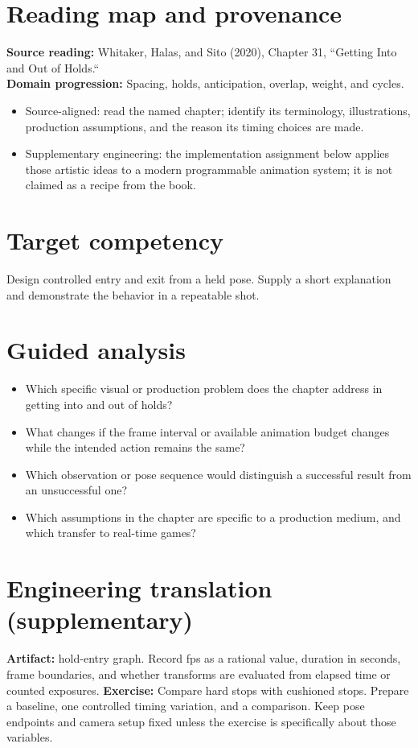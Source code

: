 \documentclass[10pt,letterpaper]{article}
\begin{document}
\makedoctitle
\makedocsummary

\section{Reading map and provenance}
\textbf{Source reading:} Whitaker, Halas, and Sito (2020), Chapter 31, ``Getting Into and Out of Holds.``\\
\textbf{Domain progression:} Spacing, holds, anticipation, overlap, weight, and cycles.
\begin{itemize}
\item Source-aligned: read the named chapter; identify its terminology, illustrations, production assumptions, and the reason its timing choices are made.
\item Supplementary engineering: the implementation assignment below applies those artistic ideas to a modern programmable animation system; it is not claimed as a recipe from the book.
\end{itemize}
\section{Target competency}
Design controlled entry and exit from a held pose. Supply a short explanation and demonstrate the behavior in a repeatable shot.
\section{Guided analysis}
\begin{itemize}
\item Which specific visual or production problem does the chapter address in getting into and out of holds?
\item What changes if the frame interval or available animation budget changes while the intended action remains the same?
\item Which observation or pose sequence would distinguish a successful result from an unsuccessful one?
\item Which assumptions in the chapter are specific to a production medium, and which transfer to real-time games?
\end{itemize}
\section{Engineering translation (supplementary)}
\textbf{Artifact:} hold-entry graph. Record fps as a rational value, duration in seconds, frame boundaries, and whether transforms are evaluated from elapsed time or counted exposures.
\textbf{Exercise:} Compare hard stops with cushioned stops. Prepare a baseline, one controlled timing variation, and a comparison. Keep pose endpoints and camera setup fixed unless the exercise is specifically about those variables.
\end{document}
